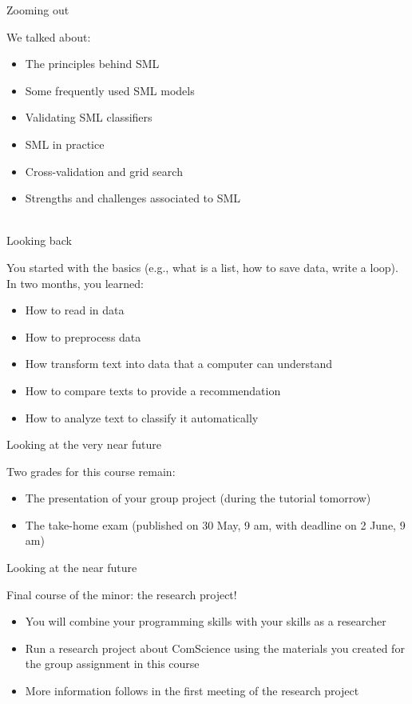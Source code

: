 \documentclass[handout]{beamer}
\begin{document}
\begin{frame}{Zooming out} 
	
	We talked about:
	\begin{itemize}
		\item The principles behind SML
		\item Some frequently used SML models
		\item Validating SML classifiers
		\item SML in practice
		\item Cross-validation and grid search
		\item Strengths and challenges associated to SML \\\
\end{itemize}
	

\end{frame}




\begin{frame}{Looking back} 
	
You started with the basics (e.g., what is a list, how to save data, write a loop).\\
In two months, you learned:
	\begin{itemize}
		\item How to read in data
		\item How to preprocess data
		\item How transform text into data that a computer can understand
		\item How to compare texts to provide a recommendation
		\item How to analyze text to classify it automatically
	
	\end{itemize}
	
\end{frame}


\begin{frame}{Looking at the very near future} 
	
Two grades for this course remain:
	\begin{itemize}
		\item The presentation of your group project (during the tutorial tomorrow)
		\item The take-home exam (published on 30 May, 9 am, with deadline on 2 June, 9 am)
	\end{itemize}
	
\end{frame}

\begin{frame}{Looking at the near future} 
	
Final course of the minor: the research project!
\begin{itemize}
		\item You will combine your programming skills with your skills as a researcher
		\item Run a research project about ComScience using the materials you created for the group assignment in this course
		\item More information follows in the first meeting of the research project
\end{itemize}
\end{frame}
\end{document}
